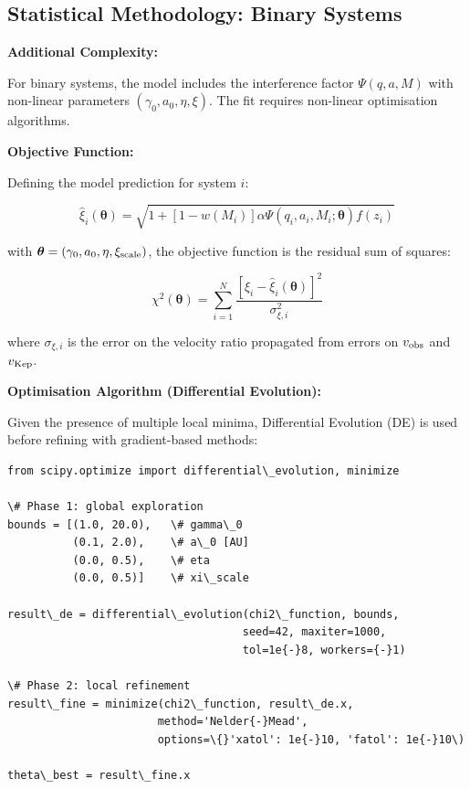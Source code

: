 \documentclass[11pt,a4paper]{article}
\begin{document}
\hypertarget{statistical-methodology-binary-systems}{%
\subsection{Statistical Methodology: Binary
Systems}\label{statistical-methodology-binary-systems}}

\textbf{Additional Complexity:}

For binary systems, the model includes the interference factor
\(\Psi(q,a,M)\) with non-linear parameters
\((\gamma_0, a_0, \eta, \xi)\). The fit requires non-linear optimisation
algorithms.

\textbf{Objective Function:}

Defining the model prediction for system \(i\):

\[\hat\xi_i(\boldsymbol\theta) = \sqrt{1 + [1-w(M_i)]\alpha \Psi(q_i,a_i,M_i;\boldsymbol\theta) f(z_i)}\]

with \(\boldsymbol\theta = (\gamma_0, a_0, \eta, \xi_{\rm scale})\), the
objective function is the residual sum of squares:

\[\chi^2(\boldsymbol\theta) = \sum_{i=1}^N \frac{[\xi_i - \hat\xi_i(\boldsymbol\theta)]^2}{\sigma_{\xi,i}^2}\]

where \(\sigma_{\xi,i}\) is the error on the velocity ratio propagated
from errors on \(v_{\rm obs}\) and \(v_{\rm Kep}\).

\textbf{Optimisation Algorithm (Differential Evolution):}

Given the presence of multiple local minima, Differential Evolution (DE)
is used before refining with gradient-based methods:

\begin{lstlisting}
from scipy.optimize import differential\_evolution, minimize

\# Phase 1: global exploration
bounds = [(1.0, 20.0),   \# gamma\_0
          (0.1, 2.0),    \# a\_0 [AU]
          (0.0, 0.5),    \# eta
          (0.0, 0.5)]    \# xi\_scale

result\_de = differential\_evolution(chi2\_function, bounds,
                                    seed=42, maxiter=1000,
                                    tol=1e{-}8, workers={-}1)

\# Phase 2: local refinement
result\_fine = minimize(chi2\_function, result\_de.x,
                       method='Nelder{-}Mead',
                       options=\{}'xatol': 1e{-}10, 'fatol': 1e{-}10\)

theta\_best = result\_fine.x
\end{lstlisting}
\end{document}
